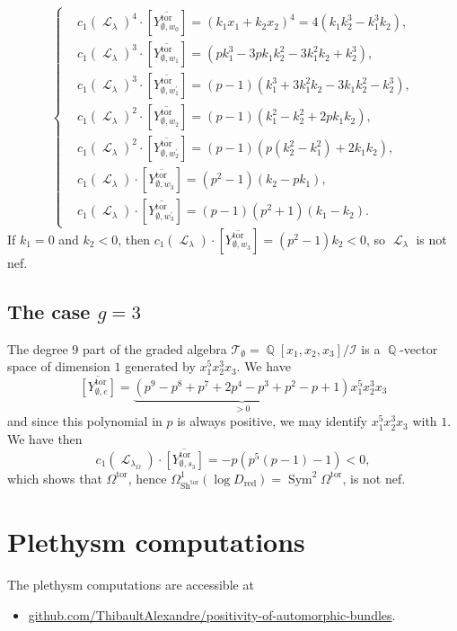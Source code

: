 \documentclass[11pt]{amsart}
\numberwithin{subsection}{section}
\numberwithin{figure}{section}
\numberwithin{table}{section}
\theoremstyle{1}
\theoremstyle{2}
\DeclareMathOperator{\Q}{\mathbb{Q}}
\DeclareMathOperator{\Sh}{Sh}
\DeclareMathOperator{\Sym}{Sym}
\DeclareMathOperator{\tor}{tor}
\DeclareMathOperator{\Lc}{\mathcal{L}}
\DeclareMathOperator{\red}{red}
\begin{document}
\begin{equation*}
\left\{
\begin{aligned}
&c_1(\Lc_{\lambda})^{4} \cdot [\overline{Y^{\tor}_{\emptyset, w_0}}] = (k_1x_1+k_2x_2)^4 = 4(k_1k_2^3-k_1^3k_2), \\
&c_1(\Lc_{\lambda})^{3} \cdot [\overline{Y^{\tor}_{\emptyset, w_1}}]  = (pk_1^3-3pk_1k_2^2-3k_1^2k_2+k_2^3), \\
&c_1(\Lc_{\lambda})^{3} \cdot [\overline{Y^{\tor}_{\emptyset, w_1^\prime}}]  = (p-1)(k_1^3+3k_1^2k_2-3k_1k_2^2-k_2^3), \\
&c_1(\Lc_{\lambda})^{2} \cdot [\overline{Y^{\tor}_{\emptyset, w_2}}]  = (p-1)(k_1^2-k_2^2+2pk_1k_2), \\
&c_1(\Lc_{\lambda})^{2} \cdot [\overline{Y^{\tor}_{\emptyset, w_2^\prime}}]  =(p-1)(p(k_2^2-k_1^2)+2k_1k_2), \\
&c_1(\Lc_{\lambda}) \cdot [\overline{Y^{\tor}_{\emptyset, w_3}}]  = (p^2-1)(k_2-pk_1), \\
&c_1(\Lc_{\lambda}) \cdot [\overline{Y^{\tor}_{\emptyset, w_3^\prime}}]  = (p-1)(p^2+1)(k_1-k_2).
\end{aligned}
\right.
\end{equation*}
If $k_1 = 0$ and $k_2 < 0$, then $c_1(\Lc_{\lambda}) \cdot [\overline{Y^{\tor}_{\emptyset, w_3}}]  = (p^2-1)k_2 < 0$, so $\Lc_{\lambda}$ is not nef.
\subsection{The case $g = 3$}
The degree $9$ part of the graded algebra $\mathcal{T}_{\emptyset} =\Q[x_1,x_2,x_3]/\mathcal{I}$ is a $\Q$-vector space of dimension $1$ generated by $x_1^5x_2^3x_3$. We have
\begin{equation*}
\overline{[Y_{\emptyset,e}^{\tor}]} = \underbrace{(p^9-p^8+p^7+2p^4-p^3+p^2-p+1)}_{>0} x_1^5x_2^3x_3
\end{equation*}
and since this polynomial in $p$ is always positive, we may identify $x_1^5x_2^3x_3$ with $1$. We have then 
\begin{equation*}
c_1(\Lc_{\lambda_{\Omega}}) \cdot \overline{[Y_{\emptyset,s_3}^{\tor}]} = -p\left( p^5(p-1)-1\right) < 0,
\end{equation*}
which shows that $\Omega^{\tor}$, hence $\Omega^1_{\Sh^{\tor}}(\log D_{\red}) = \Sym^2\Omega^{\tor}$, is not nef.
\section{Plethysm computations}\label{appendix2}
The plethysm computations are accessible at
\begin{itemize}
\item \href{https://github.com/ThibaultAlexandre/positivity-of-automorphic-bundles}{github.com/ThibaultAlexandre/positivity-of-automorphic-bundles}.
\end{itemize}
\end{document}
